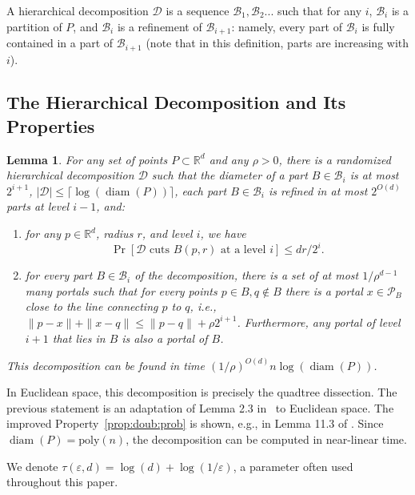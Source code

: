 \documentclass[11pt]{article}
\newtheorem{lemma}[theorem]{Lemma}
\newcommand{\R}{\mathbb R}
\newcommand{\eps}{\varepsilon}
\newcommand{\poly}{\mathrm{ poly}}
\newcommand{\calB}{\mathcal {B}}
\newcommand{\calD}{\mathcal {D}}
\newcommand{\calP}{\mathcal {P}}
\newcommand{\badcut}{\eps}
\newcommand{\offset}{\tau(\eps, d)}
\DeclareMathOperator{\diam}{diam}
\begin{document}
A hierarchical decomposition $\calD$ is a sequence $\calB_1, \calB_2 ...$ such that for any $i$, $\calB_i$ is a partition of $P$, and $\calB_i$ is a refinement of $\calB_{i+1}$: namely, every part of $\calB_i$ is fully contained in a part of $\calB_{i+1}$ (note that in this definition, parts are increasing with $i$).

\subsection{The Hierarchical Decomposition and Its Properties}



\begin{lemma}\label{lem:talwar-decomp}
For any set of points $P \subset \R^d$ and any $\rho > 0$, 
there is a randomized hierarchical 
decomposition $\calD$ such that the diameter of a part $B \in \calB_i$ is at most
$2^{i+1}$, $|\calD|\leq\lceil\log(\diam(P))\rceil$, each part $B \in \calB_i$ is refined in at most $2^{O(d)}$ parts at level $i-1$, and:

\begin{enumerate}

  \item\label{prop:doub:prob} for any $p \in \R^d$, %
radius $r$, and level $i$, we have 
    \[\Pr[\calD \text{ cuts } B(p,r) \text{ at a level } i] \leq  dr/2^i.\]

 \item\label{prop:doub:portals} for every part $B\in \calB_i$ of the decomposition, there is a set of at most $ 1/\rho^{d-1}$ many 
    \emph{portals} such that for every points $p \in B, q \notin B$ there is a portal $x\in\calP_B$ close to the line connecting $p$ to $q$, i.e., 
$\|p-x\| + \|x-q\| \leq \|p-q\| + \rho 2^{i+1}$.
Furthermore, any portal of level $i+1$ that lies in $B$ is also a 
portal of $B$.
    \end{enumerate}
This decomposition can be found in time $(1/\rho)^{O(d)} n \log (\diam(P))$.
\end{lemma}

In Euclidean space, this decomposition is precisely the quadtree dissection. The previous statement is an adaptation of Lemma 2.3 in~\cite{jacm} to Euclidean space. The improved Property~\ref{prop:doub:prob} is shown, e.g., in Lemma 11.3 of \cite{har2011geometric}.
Since $\diam(P) = \poly(n)$, the decomposition can be computed in near-linear time.

We denote %
$\offset = \log(d) + \log(1/\badcut)$,
a parameter often used throughout this paper.
\end{document}
